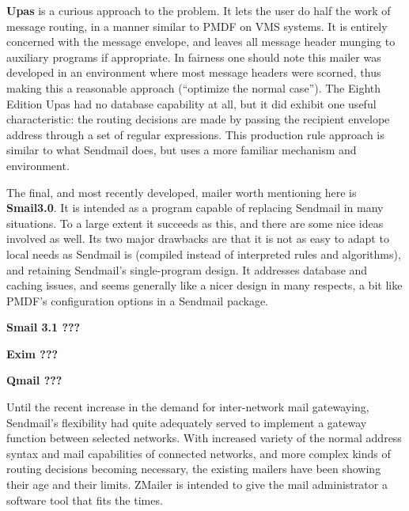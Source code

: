 {\bf Upas} is a curious approach to the problem. It lets the user do half the
work of message routing, in a manner similar to PMDF on VMS systems. It is
entirely concerned with the message envelope, and leaves all message header
munging to auxiliary programs if appropriate. In fairness one should note
this mailer was developed in an environment where most message headers were
scorned, thus making this a reasonable approach (``optimize the normal
case''). The Eighth Edition Upas had no database capability at all, but it
did exhibit one useful characteristic: the routing decisions are made by
passing the recipient envelope address through a set of regular
expressions. This production rule approach is similar to what Sendmail
does, but uses a more familiar mechanism and environment.

The final, and most recently developed, mailer worth mentioning here is
{\bf Smail3.0}.
It is intended as a program capable of replacing Sendmail in many
situations. To a large extent it succeeds as this, and there are some nice
ideas involved as well. Its two major drawbacks are that it is not as easy
to adapt to local needs as Sendmail is (compiled instead of interpreted
rules and algorithms), and retaining Sendmail's single-program design.  It
addresses database and caching issues, and seems generally like a nicer
design in many respects, a bit like PMDF's configuration options in a
Sendmail package.

{\bf Smail 3.1 ???}

{\bf Exim ???}

{\bf Qmail ???}

Until the recent increase in the demand for inter-network mail gatewaying,
Sendmail's flexibility had quite adequately served to implement a gateway
function between selected networks.  With increased variety of the normal
address syntax and mail capabilities of connected networks, and more complex
kinds of routing decisions becoming necessary, the existing mailers have
been showing their age and their limits.  ZMailer is intended to give the
mail administrator a software tool that fits the times.
